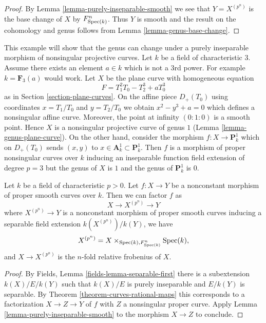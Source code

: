 \begin{proof}
By Lemma \ref{lemma-purely-inseparable-smooth}
we see that $Y = X^{(p^n)}$ is the base change of
$X$ by $F_{\mathop{\mathrm{Spec}}(k)}^n$. Thus $Y$ is smooth and the result on the
cohomology and genus follows from
Lemma \ref{lemma-genus-base-change}.
\end{proof}

\begin{example}
\label{example-inseparable}
This example will show that the genus can change under a
purely inseparable morphism of nonsingular projective curves.
Let $k$ be a field of characteristic $3$. Assume there exists
an element $a \in k$ which is not a $3$rd power. For example
$k = \mathbf{F}_3(a)$ would work. Let $X$ be the plane curve
with homogeneous equation
$$
F = T_1^2T_0 - T_2^3 + aT_0^3
$$
as in Section \ref{section-plane-curves}.
On the affine piece $D_+(T_0)$ using coordinates $x = T_1/T_0$
and $y = T_2/T_0$ we obtain $x^2 - y^3 + a = 0$ which defines
a nonsingular affine curve. Moreover, the point at infinity
$(0 : 1: 0)$ is a smooth point. Hence $X$ is a nonsingular projective
curve of genus $1$ (Lemma \ref{lemma-genus-plane-curve}).
On the other hand, consider the morphism
$f : X \to \mathbf{P}^1_k$ which on $D_+(T_0)$ sends $(x, y)$ to
$x \in \mathbf{A}^1_k \subset \mathbf{P}^1_k$.
Then $f$ is a morphism of proper nonsingular curves over $k$
inducing an inseparable function field extension of degree $p = 3$
but the genus of $X$ is $1$ and the genus of $\mathbf{P}^1_k$ is $0$.
\end{example}

\begin{proposition}
\label{proposition-unwind-morphism-smooth}
Let $k$ be a field of characteristic $p > 0$. Let $f : X \to Y$ be a
nonconstant morphism of proper smooth curves over $k$.
Then we can factor $f$ as
$$
X \longrightarrow X^{(p^n)} \longrightarrow Y
$$
where $X^{(p^n)} \to Y$ is a nonconstant morphism of proper smooth curves
inducing a separable field extension $k(X^{(p^n)})/k(Y)$, we have
$$
X^{(p^n)} = X \times_{\mathop{\mathrm{Spec}}(k), F_{\mathop{\mathrm{Spec}}(k)}^n} \mathop{\mathrm{Spec}}(k),
$$
and $X \to X^{(p^n)}$ is the $n$-fold relative frobenius of $X$.
\end{proposition}

\begin{proof}
By Fields, Lemma \ref{fields-lemma-separable-first}
there is a subextension $k(X)/E/k(Y)$ such that
$k(X)/E$ is purely inseparable and $E/k(Y)$ is separable.
By Theorem \ref{theorem-curves-rational-maps}
this corresponds to a factorization
$X \to Z \to Y$ of $f$ with $Z$ a nonsingular proper curve.
Apply Lemma \ref{lemma-purely-inseparable-smooth}
to the morphism $X \to Z$ to conclude.
\end{proof}

